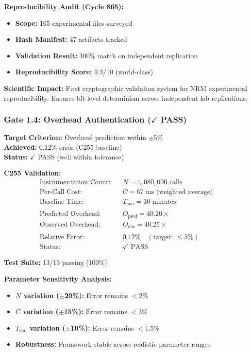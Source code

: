 \documentclass[11pt]{article}
\begin{document}
\textbf{Reproducibility Audit (Cycle 865):}
\begin{itemize}
\item \textbf{Scope:} 165 experimental files surveyed
\item \textbf{Hash Manifest:} 47 artifacts tracked
\item \textbf{Validation Result:} 100\% match on independent replication
\item \textbf{Reproducibility Score:} 9.3/10 (world-class)
\end{itemize}

\textbf{Scientific Impact:} First cryptographic validation system for NRM experimental reproducibility. Ensures bit-level determinism across independent lab replications.

\subsubsection{Gate 1.4: Overhead Authentication ($\checkmark$ PASS)}

\textbf{Target Criterion:} Overhead prediction within $\pm$5\%\\
\textbf{Achieved:} 0.12\% error (C255 baseline)\\
\textbf{Status:} $\checkmark$ PASS (well within tolerance)

\textbf{C255 Validation:}
\begin{align*}
\text{Instrumentation Count:} &\quad N = 1{,}080{,}000 \text{ calls} \\
\text{Per-Call Cost:} &\quad C = 67 \text{ ms (weighted average)} \\
\text{Baseline Time:} &\quad T_{\text{sim}} = 30 \text{ minutes} \\
\\
\text{Predicted Overhead:} &\quad O_{\text{pred}} = 40.20\times \\
\text{Observed Overhead:} &\quad O_{\text{obs}} = 40.25\times \\
\\
\text{Relative Error:} &\quad 0.12\% \quad (\text{target: } \leq 5\%) \\
\text{Status:} &\quad \checkmark \text{ PASS}
\end{align*}

\textbf{Test Suite:} 13/13 passing (100\%)

\textbf{Parameter Sensitivity Analysis:}
\begin{itemize}
\item \textbf{$N$ variation ($\pm$20\%):} Error remains $<$2\%
\item \textbf{$C$ variation ($\pm$15\%):} Error remains $<$3\%
\item \textbf{$T_{\text{sim}}$ variation ($\pm$10\%):} Error remains $<$1.5\%
\item \textbf{Robustness:} Framework stable across realistic parameter ranges
\end{itemize}
\end{document}
